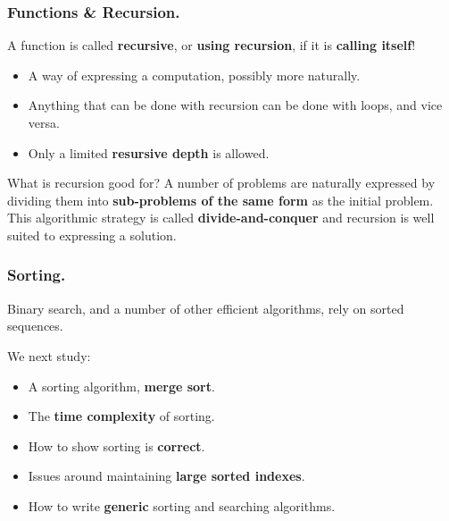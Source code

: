\documentclass{beamer} %
\newcommand\emc[1]{\textcolor{brightblue}{\textbf{#1}}}
\begin{document}
\begin{frame}
\frametitle{Functions \& Recursion.}

A function is called \emc{recursive}, or \emc{using recursion}, if it is \emc{calling itself}!
\begin{itemize}
	\item A way of expressing a computation, possibly more naturally.
	\item Anything that can be done with recursion can be done with loops, and vice versa.
	\item Only a limited \emc{resursive depth} is allowed.
\end{itemize}

\begin{block}{What is recursion good for?}
A number of problems are naturally expressed by dividing them into \emc{sub-problems of the same form} as the initial problem. This algorithmic strategy is called \emc{divide-and-conquer} and recursion is well suited to expressing a solution.
\end{block}

\end{frame}



\begin{frame}
\frametitle{Sorting.}

Binary search, and a number of other efficient algorithms, rely on sorted sequences. 

\vspace{3mm}
We next study:
\begin{itemize}
	\item A sorting algorithm, \emc{merge sort}.
	\item The \emc{time complexity} of sorting.
	\item How to show sorting is \emc{correct}.
	\item Issues around maintaining \emc{large sorted indexes}.
	\item How to write \emc{generic} sorting and searching algorithms.
\end{itemize}

\end{frame}
\end{document}
